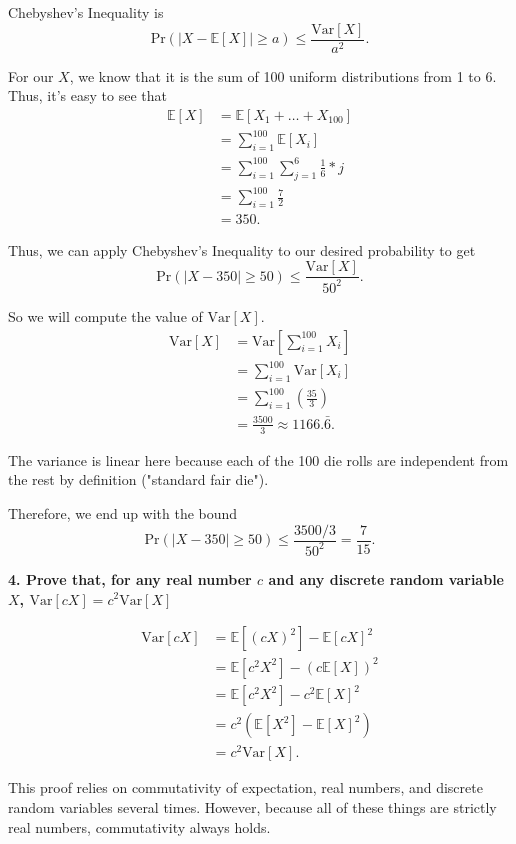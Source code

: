 \documentclass[letterpaper, 12pt]{article}
\newcommand{\E}{ \mathbb{E} }
\newcommand{\Var}{ \text{Var} }
\newcommand{\Pr}{ \text{Pr} }
\begin{document}
Chebyshev's Inequality is
$$\Pr(|X - \E[X]| \geq a) \leq \frac{\Var[X]}{a^2}.$$

For our $X$, we know that it is the sum of 100 uniform distributions from 1 to 6. Thus, it's easy to see that 
\begin{align*}
    \E[X] &= \E[X_1 + \dots + X_{100}] \\
          &= \sum_{i=1}^{100} \E[X_i] \\
          &= \sum_{i=1}^{100} \sum_{j=1}^6 \frac{1}{6}*j \\
          &= \sum_{i=1}^{100} \frac{7}{2} \\
          &= 350.
\end{align*}

Thus, we can apply Chebyshev's Inequality to our desired probability to get
$$\Pr(|X - 350| \geq 50) \leq \frac{\Var[X]}{50^2}.$$

So we will compute the value of $\Var[X]$.
\begin{align*}
    \Var[X] &= \Var[\sum_{i=1}^{100}X_i] \\
            &= \sum_{i=1}^{100}\Var[X_i] \\
            &= \sum_{i=1}^{100} (\frac{35}{3})  \\
            &= \frac{3500}{3} \approx 1166.\bar{6}.
\end{align*}

The variance is linear here because each of the 100 die rolls are independent from the rest by definition ("standard fair die").

Therefore, we end up with the bound 
$$\Pr(|X - 350| \geq 50) \leq \frac{3500/3}{50^2} = \frac{7}{15}.$$

\noindent\textbf{4. Prove that, for any real number $c$ and any discrete random variable $X$, $\Var[cX] = c^2\Var[X]$}

\begin{align*}
    \Var[cX] &= \E[(cX)^2] - \E[cX]^2 \\
             &= \E[c^2X^2] - (c\E[X])^2 \\
             &= \E[c^2X^2] - c^2\E[X]^2 \\
             &= c^2( \E[X^2] - \E[X]^2 ) \\
             &= c^2\Var[X].
\end{align*}

This proof relies on commutativity of expectation, real numbers, and discrete random variables several times. However, because all of these things are strictly real numbers, commutativity always holds.
\end{document}
